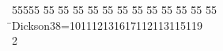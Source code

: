 %
%
\begin{tabbing}
55555 \= 55 \= 55 \= 55 \= 55 \= 55 \= 55 \= 55 \= 55 \= 55 \= 55 \= 55 \= 55 \= \>Dickson38=101112131617112113115119\\[0pt]
2\>\end{tabbing}

